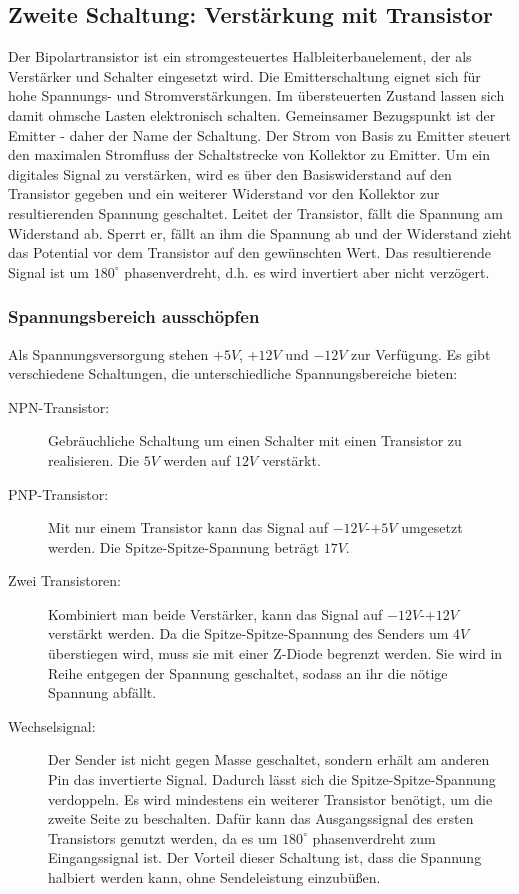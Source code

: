 \subsection{Zweite Schaltung: Verstärkung mit Transistor}
Der Bipolartransistor ist ein stromgesteuertes Halbleiterbauelement, der als Verstärker und Schalter eingesetzt wird. Die Emitterschaltung eignet sich für hohe Spannungs- und Stromverstärkungen. Im übersteuerten Zustand lassen sich damit ohmsche Lasten elektronisch schalten. Gemeinsamer Bezugspunkt ist der Emitter - daher der Name der Schaltung. Der Strom von Basis zu Emitter steuert den maximalen Stromfluss der Schaltstrecke von Kollektor zu Emitter. Um ein digitales Signal zu verstärken, wird es über den Basiswiderstand auf den Transistor gegeben und ein weiterer Widerstand vor den Kollektor zur resultierenden Spannung geschaltet. Leitet der Transistor, fällt die Spannung am Widerstand ab. Sperrt er, fällt an ihm die Spannung ab und  der Widerstand zieht das Potential vor dem Transistor auf den gewünschten Wert. Das resultierende Signal ist um $180^\circ$ phasenverdreht, d.h. es wird invertiert aber nicht verzögert.\\


\subsubsection{Spannungsbereich ausschöpfen}
Als Spannungsversorgung stehen $+5V$, $+12V$ und $-12V$ zur Verfügung. Es gibt verschiedene Schaltungen, die unterschiedliche Spannungsbereiche bieten:
\begin{description}
	\item[NPN-Transistor:] Gebräuchliche Schaltung um einen Schalter mit einen Transistor zu realisieren. Die $5V$ werden auf $12V$ verstärkt.
	\item[PNP-Transistor:] Mit nur einem Transistor kann das Signal auf $-12V$-$+5V$ umgesetzt werden. Die Spitze-Spitze-Spannung beträgt $17V$.
	\item[Zwei Transistoren:] Kombiniert man beide Verstärker, kann das Signal auf $-12V$-$+12V$ verstärkt werden. Da die Spitze-Spitze-Spannung des Senders um $4V$ überstiegen wird, muss sie mit einer Z-Diode begrenzt werden. Sie wird in Reihe entgegen der Spannung geschaltet, sodass an ihr die nötige Spannung abfällt.
	\item[Wechselsignal:] Der Sender ist nicht gegen Masse geschaltet, sondern erhält am anderen Pin das invertierte Signal. Dadurch lässt sich die Spitze-Spitze-Spannung verdoppeln. Es wird mindestens ein weiterer Transistor benötigt, um die zweite Seite zu beschalten. Dafür kann das Ausgangssignal des ersten Transistors genutzt werden, da es um $180^\circ$ phasenverdreht zum Eingangssignal ist. Der Vorteil dieser Schaltung ist, dass die Spannung halbiert werden kann, ohne Sendeleistung einzubüßen.
\end{description}

